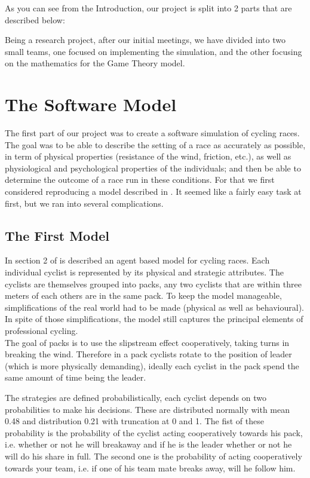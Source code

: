 \documentclass[10pt, a4paper]{report}
\begin{document}
As you can see from the Introduction, our project is split into 2 parts that are described below:

Being a research project, after our initial meetings, we have divided into two small teams, one focused on implementing the simulation, and the other focusing on the mathematics for the Game Theory model.


\section{The Software Model}\label{sec:softmodel}

The first part of our project was to create a software simulation of cycling races. The goal was to be able to describe the setting of a race as accurately as possible, in term of physical properties (resistance of the wind, friction, etc.), as well as physiological and psychological properties of the individuals; and then be able to determine the outcome of a race run in these conditions. For that we first considered reproducing a model described in \cite{AgentModel}. It seemed like a fairly easy task at first, but we ran into several complications.

\subsection{The First Model}\label{subsec:model1}

In section 2 of \cite{AgentModel} is described an agent based model for cycling races. Each individual cyclist is represented by its physical and strategic attributes. The cyclists are themselves grouped into packs, any two cyclists that are within three meters of each others are in the same pack. To keep the model manageable, simplifications of the real world had to be made (physical as well as behavioural). In spite of those simplifications, the model still captures the principal elements of professional cycling. \\

The goal of packs is to use the slipstream effect cooperatively, taking turns in breaking the wind. Therefore in a pack cyclists rotate to the position of leader (which is more physically demanding), ideally each cyclist in the pack spend the same amount of time being the leader.

The strategies are defined probabilistically, each cyclist depends on two probabilities to make his decisions. These are distributed normally with mean 0.48 and distribution 0.21 with truncation at 0 and 1. The fist of these probability is the probability of the cyclist acting cooperatively towards his pack, i.e. whether or not he will breakaway and if he is the leader whether or not he will do his share in full. The second one is the probability of acting cooperatively towards your team, i.e. if one of his team mate breaks away, will he follow him. \\
\end{document}
